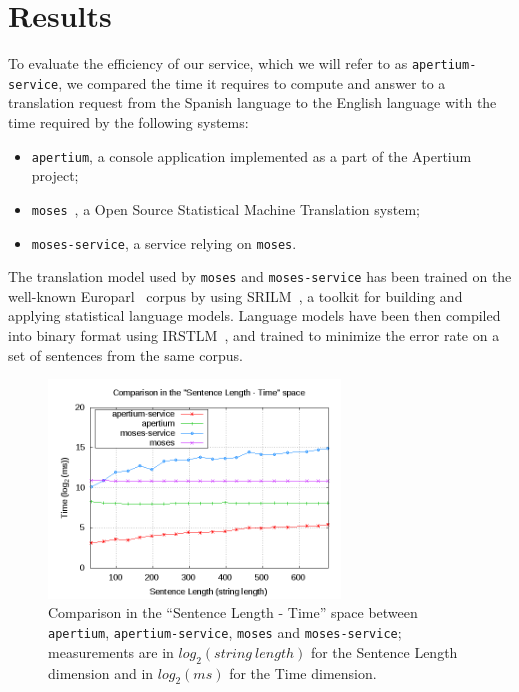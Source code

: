 \documentclass[11pt]{article}
\begin{document}
\section{Results}

To evaluate the efficiency of our service, which we will refer to as {\tt apertium-service}, we compared the time it requires to compute and answer to a translation request from the Spanish language to the English language with the time required by the following systems:

\begin{itemize}
 \item {\tt apertium}, a console application implemented as a part of the Apertium project;
 \item {\tt moses}~\citep{moses}, a Open Source Statistical Machine Translation system;
 \item {\tt moses-service}, a service relying on {\tt moses}.
\end{itemize}

The translation model used by {\tt moses} and {\tt moses-service} has been trained on the well-known Europarl~\citep{europarl} corpus by using SRILM~\citep{srilm}, a toolkit for building and applying statistical language models. Language models have been then compiled into binary format using IRSTLM~\citep{irstlm}, and trained to minimize the error rate on a set of sentences from the same corpus. 

\begin{figure}[!ht]
\begin{center}
\includegraphics[width=7.75cm]{comp}
\end{center}
\caption{Comparison in the ``Sentence Length - Time'' space between {\tt apertium}, {\tt apertium-service}, {\tt moses} and {\tt moses-service}; measurements are in $log_{2}(string\ length)$ for the Sentence Length dimension and in $log_{2}(ms)$ for the Time dimension.}
\label{fig:comp}
\end{figure}
\end{document}

